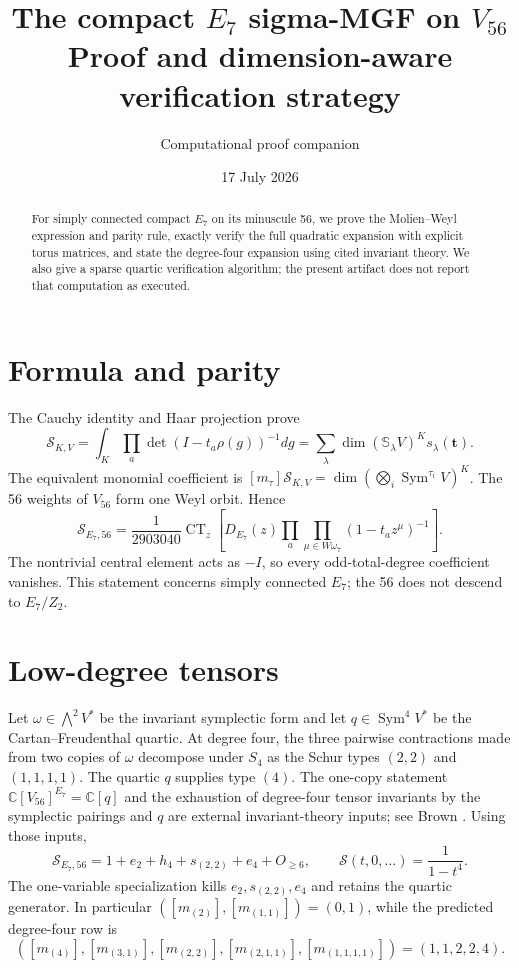 \documentclass[10pt]{article}
\title{\color{navy}\textbf{The compact $E_7$ sigma-MGF on $V_{56}$}\\[1mm]\large Proof and dimension-aware verification strategy}
\author{Computational proof companion}\date{17 July 2026}
\newcommand{\Sg}{\mathcal S}\newcommand{\CT}{\operatorname{CT}}
\begin{document}
\maketitle
\begin{abstract}
For simply connected compact $E_7$ on its minuscule 56, we prove the
Molien--Weyl expression and parity rule, exactly verify the full quadratic
expansion with explicit torus matrices, and state the degree-four expansion
using cited invariant theory.  We also give a sparse quartic verification
algorithm; the present artifact does not report that computation as executed.
\end{abstract}

\section{Formula and parity}
The Cauchy identity and Haar projection prove
\[
 \Sg_{K,V}=\int_K\prod_a\det(I-t_a\rho(g))^{-1}dg
 =\sum_\lambda\dim(\mathbb S_\lambda V)^K s_\lambda(\mathbf t).
\]
The equivalent monomial coefficient is
$[m_\tau]\Sg_{K,V}=\dim(\bigotimes_i\operatorname{Sym}^{\tau_i}V)^K$.
The 56 weights of $V_{56}$ form one Weyl orbit.  Hence
\[
 \boxed{\Sg_{E_7,56}=\frac1{2903040}\CT_z\left[D_{E_7}(z)
 \prod_a\prod_{\mu\in W\omega_7}(1-t_a z^\mu)^{-1}\right].}
\]
The nontrivial central element acts as $-I$, so every odd-total-degree
coefficient vanishes.  This statement concerns simply connected $E_7$; the
56 does not descend to $E_7/Z_2$.

\section{Low-degree tensors}
Let $\omega\in\bigwedge^2V^*$ be the invariant symplectic form and let
$q\in\operatorname{Sym}^4V^*$ be the Cartan--Freudenthal quartic.  At degree
four, the three pairwise contractions made from two copies of $\omega$
decompose under $S_4$ as the Schur types $(2,2)$ and $(1,1,1,1)$.  The quartic
$q$ supplies type $(4)$.  The one-copy statement
$\mathbb C[V_{56}]^{E_7}=\mathbb C[q]$ and the exhaustion of degree-four
tensor invariants by the symplectic pairings and $q$ are external
invariant-theory inputs; see Brown \cite{brown}.  Using those inputs,
\[
 \boxed{\Sg_{E_7,56}=1+e_2+h_4+s_{(2,2)}+e_4+O_{\ge6}},
 \qquad \boxed{\Sg(t,0,\ldots)=\frac1{1-t^4}}.
\]
The one-variable specialization kills $e_2,s_{(2,2)},e_4$ and retains the
quartic generator.
In particular $([m_{(2)}],[m_{(1,1)}])=(0,1)$, while the predicted degree-four
row is
\[
([m_{(4)}],[m_{(3,1)}],[m_{(2,2)}],[m_{(2,1,1)}],[m_{(1,1,1,1)}])
=(1,1,2,2,4).
\]
\end{document}

